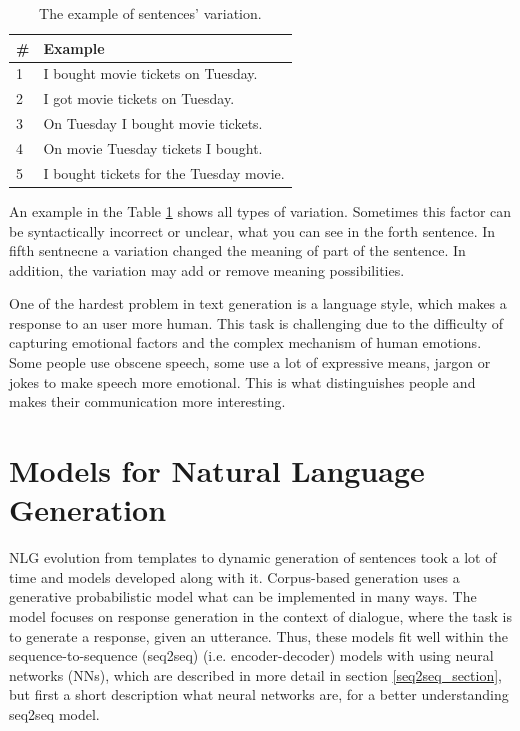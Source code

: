 \begin{table}[ht]
\centering
 \begin{tabular}{|p{0.5cm}|p{8cm}|} 
 \hline
 \# & Example \\
 \hline
 1 & I bought movie tickets on Tuesday. \\ 
 \hline
 2 & I got movie tickets on Tuesday. \\
 \hline
 3 & On Tuesday I bought movie tickets. \\
 \hline
 4 & On movie Tuesday tickets I bought. \\
 \hline
 5 & I bought tickets for the Tuesday movie. \\ 
 \hline
 \end{tabular}
 \caption{The example of sentences' variation.}
\label{tab:var_example}
\end{table}

An example in the Table \ref{tab:var_example} shows all types of variation. Sometimes this factor can be syntactically incorrect or unclear, what you can see in the forth sentence. In fifth sentnecne a variation changed the meaning of part of the sentence. In addition, the variation may add or remove meaning possibilities.


One of the hardest problem in text generation is a language style, which makes a response to an user more human. This task is challenging due to the difficulty of capturing emotional factors and the complex mechanism of human emotions. Some people use obscene speech, some use a lot of expressive means, jargon or jokes to make speech more emotional. This is what distinguishes people and makes their communication more interesting.

\chapter{Models for Natural Language Generation} \label{nlg_models}
NLG evolution from templates to dynamic generation of sentences took a lot of time and models developed along with it. Corpus-based generation uses a generative probabilistic model what can be implemented in many ways. The model focuses on response generation in the context of dialogue, where the task is to generate a response, given an utterance. Thus, these models fit well within the sequence-to-sequence (seq2seq) (i.e. encoder-decoder) models with using neural networks (NNs), which are described in more detail in section \ref{seq2seq_section}, but first a short description what neural networks are, for a better understanding seq2seq model.

